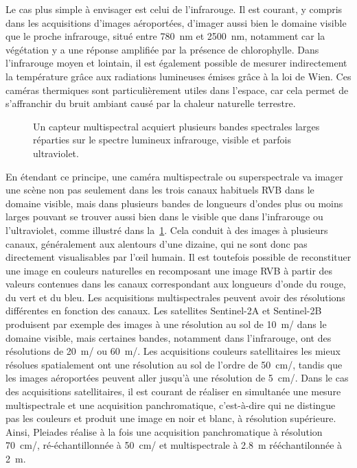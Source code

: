 Le cas plus simple à envisager est celui de l'infrarouge. Il est courant, y compris dans les acquisitions d'images aéroportées, d'imager aussi bien le domaine visible que le proche infrarouge, situé entre \SI{780}{\nano\meter} et \SI{2 500}{\nano\meter}, notamment car la végétation y a une réponse amplifiée par la présence de chlorophylle. Dans l'infrarouge moyen et lointain, il est également possible de mesurer indirectement la température grâce aux radiations lumineuses émises grâce à la loi de Wien. Ces caméras thermiques sont particulièrement utiles dans l'espace, car cela permet de s'affranchir du bruit ambiant causé par la chaleur naturelle terrestre.

\begin{figure}
  \resizebox{\textwidth}{!}{
  
  }
  \caption{Un capteur multispectral acquiert plusieurs bandes spectrales larges réparties sur le spectre lumineux infrarouge, visible et parfois ultraviolet.}
  \label{fig:multispectral}
\end{figure}

En étendant ce principe, une caméra multispectrale ou superspectrale va imager une scène non pas seulement dans les trois canaux habituels \gls{RVB} dans le domaine visible, mais dans plusieurs bandes de longueurs d'ondes plus ou moins larges pouvant se trouver aussi bien dans le visible que dans l'infrarouge ou l'ultraviolet, comme illustré dans la~\cref{fig:multispectral}. Cela conduit à des images à plusieurs canaux, généralement aux alentours d'une dizaine, qui ne sont donc pas directement visualisables par l'\oe{}il humain. Il est toutefois possible de reconstituer une image en couleurs naturelles en recomposant une image \gls{RVB} à partir des valeurs contenues dans les canaux correspondant aux longueurs d'onde du rouge, du vert et du bleu. Les acquisitions multispectrales peuvent avoir des résolutions différentes en fonction des canaux. Les satellites Sentinel-2A et Sentinel-2B produisent par exemple des images à une résolution au sol de \SI{10}{\meter/\px} dans le domaine visible, mais certaines bandes, notamment dans l'infrarouge, ont des résolutions de \SI{20}{\meter/\px} ou \SI{60}{\meter/\px}. Les acquisitions couleurs satellitaires les mieux résolues spatialement ont une résolution au sol de l'ordre de \SI{50}{\centi\meter/\px}, tandis que les images aéroportées peuvent aller jusqu'à une résolution de \SI{5}{\centi\meter/\px}. Dans le cas des acquisitions satellitaires, il est courant de réaliser en simultanée une mesure multispectrale et une acquisition panchromatique, c'est-à-dire qui ne distingue pas les couleurs et produit une image en noir et blanc, à résolution supérieure. Ainsi, \gls{Pleiades} réalise à la fois une acquisition panchromatique à résolution \SI{70}{\centi\meter/\px}, ré-échantillonnée à \SI{50}{\centi\meter/\px} et multispectrale à \SI{2,8}{\meter} rééchantilonnée à \SI{2}{\meter}.

